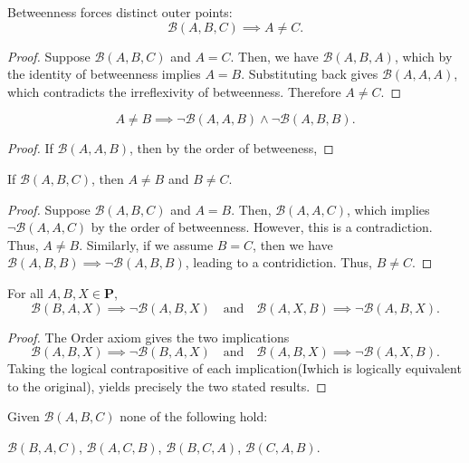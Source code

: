 \documentclass[../../../main/main.tex]{subfiles}
\begin{document}
\begin{theorem}
    Betweenness forces distinct outer points:
    \[
    \mathcal{B}(A,B,C) \implies A \neq C.
    \]
\end{theorem}
\begin{proof}
    Suppose $\mathcal{B}(A,B,C)$ and $A = C$. Then, we have $\mathcal{B}(A,B,A)$, which by the identity of betweenness implies $A = B$. Substituting back gives $\mathcal{B}(A,A,A)$, which contradicts the irreflexivity of betweenness. Therefore $A \neq C$.
\end{proof}

\begin{theorem}
    \[
    A \neq B \implies \neg \mathcal{B}(A,A,B) \land \neg \mathcal{B}(A,B,B).
    \]
\end{theorem}
\begin{proof}
    If $\mathcal{B} (A,A,B)$, then by the order of betweeness,
\end{proof}


\begin{theorem}
    If $\mathcal{B}(A,B,C)$, then $A \neq B$ and $B \neq C$.
\end{theorem}
\begin{proof}
Suppose $\mathcal{B}(A,B,C)$ and $A = B$. Then, $\mathcal{B}(A,A,C)$, which implies $\neg \mathcal{B}(A,A,C)$ by the order of betweenness. However, this is a contradiction. Thus, $A \neq B$.
Similarly, if we assume $B = C$, then we have $\mathcal{B}(A,B,B) \implies \neg \mathcal{B}(A,B,B)$, leading to a contridiction. Thus, $B \neq C$.
\end{proof}

\begin{theorem}
    For all $A,B,X \in \mathbf{P}$,
    \[
    \mathcal{B}(B,A,X) \implies \neg\mathcal{B}(A,B,X)
    \quad\text{and}\quad
    \mathcal{B}(A,X,B) \implies \neg\mathcal{B}(A,B,X).
    \]
\end{theorem}
\begin{proof}
    The Order axiom gives the two implications
    \[
    \mathcal{B}(A,B,X) \implies \neg\mathcal{B}(B,A,X)
    \quad\text{and}\quad
    \mathcal{B}(A,B,X) \implies \neg\mathcal{B}(A,X,B).
    \]
    Taking the logical contrapositive of each implication(Iwhich is logically equivalent to the original), yields precisely the two stated results.
\end{proof}

\begin{theorem}
    Given $\mathcal{B}(A,B,C)$ none of the following hold:

    $\mathcal{B}(B,A,C)$, $\mathcal{B}(A,C,B)$, $\mathcal{B}(B,C,A)$, $\mathcal{B}(C,A,B)$.
\end{theorem}
\end{document}
